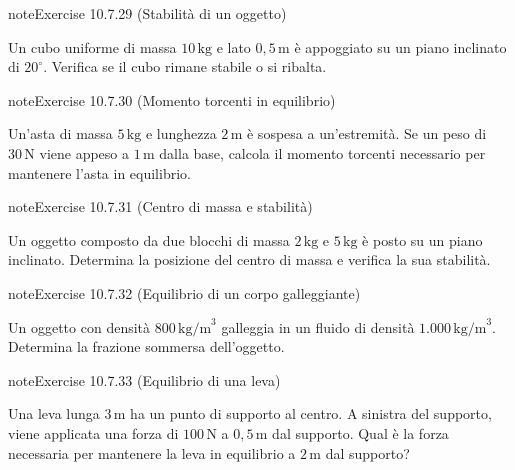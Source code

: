 \documentclass[letterpaper,10pt,italian]{jupyterBook}
\begin{document}
\begin{sphinxadmonition}{note}{Exercise 10.7.29 (Stabilità di un oggetto)}



\sphinxAtStartPar
Un cubo uniforme di massa \(10 \, \text{kg}\) e lato \(0,5 \, \text{m}\) è appoggiato su un piano inclinato di \(20^\circ\). Verifica se il cubo rimane stabile o si ribalta.
\end{sphinxadmonition}
 \label{exercise:ch/mechanics/dynamics-problems-exercise-29}

\begin{sphinxadmonition}{note}{Exercise 10.7.30 (Momento torcenti in equilibrio)}



\sphinxAtStartPar
Un’asta di massa \(5 \, \text{kg}\) e lunghezza \(2 \, \text{m}\) è sospesa a un’estremità. Se un peso di \(30 \, \text{N}\) viene appeso a \(1 \, \text{m}\) dalla base, calcola il momento torcenti necessario per mantenere l’asta in equilibrio.
\end{sphinxadmonition}
 \label{exercise:ch/mechanics/dynamics-problems-exercise-30}

\begin{sphinxadmonition}{note}{Exercise 10.7.31 (Centro di massa e stabilità)}



\sphinxAtStartPar
Un oggetto composto da due blocchi di massa \(2 \, \text{kg}\) e \(5 \, \text{kg}\) è posto su un piano inclinato. Determina la posizione del centro di massa e verifica la sua stabilità.
\end{sphinxadmonition}
 \label{exercise:ch/mechanics/dynamics-problems-exercise-31}

\begin{sphinxadmonition}{note}{Exercise 10.7.32 (Equilibrio di un corpo galleggiante)}



\sphinxAtStartPar
Un oggetto con densità \(800 \, \text{kg/m}^3\) galleggia in un fluido di densità \(1.000 \, \text{kg/m}^3\). Determina la frazione sommersa dell’oggetto.
\end{sphinxadmonition}
 \label{exercise:ch/mechanics/dynamics-problems-exercise-32}

\begin{sphinxadmonition}{note}{Exercise 10.7.33 (Equilibrio di una leva)}



\sphinxAtStartPar
Una leva lunga \(3 \, \text{m}\) ha un punto di supporto al centro. A sinistra del supporto, viene applicata una forza di \(100 \, \text{N}\) a \(0,5 \, \text{m}\) dal supporto. Qual è la forza necessaria per mantenere la leva in equilibrio a \(2 \, \text{m}\) dal supporto?
\end{sphinxadmonition}
 \label{exercise:ch/mechanics/dynamics-problems-exercise-33}
\end{document}
